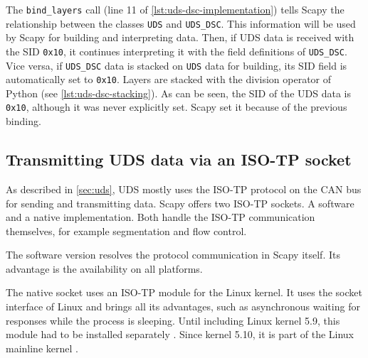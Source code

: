 The \texttt{bind_layers} call (line 11 of \autoref{lst:uds-dsc-implementation}) tells Scapy the relationship between the classes \texttt{UDS} and \texttt{UDS_DSC}. This information will be used by Scapy for building and interpreting data.
Then, if UDS data is received with the SID \texttt{0x10}, it continues interpreting it with the field definitions of \texttt{UDS_DSC}. Vice versa, if \texttt{UDS_DSC} data is stacked on \texttt{UDS} data for building, its SID field is automatically set to \texttt{0x10}. Layers are stacked with the division operator of Python (see \autoref{lst:uds-dsc-stacking}). As can be seen, the SID of the UDS data is \texttt{0x10}, although it was never explicitly set. Scapy set it because of the previous binding.




\subsection{Transmitting UDS data via an ISO-TP socket}
\label{subsec:isotp}

As described in \autoref{sec:uds}, UDS mostly uses the ISO-TP protocol on the CAN bus for sending and transmitting data.
Scapy offers two ISO-TP sockets. A software and a native implementation. Both handle the ISO-TP communication themselves, for example segmentation and flow control.

The software version resolves the protocol communication in Scapy itself. Its advantage is the availability on all platforms.

The native socket uses an ISO-TP module for the Linux kernel. It uses the socket interface of Linux and brings all its advantages, such as asynchronous waiting for responses while the process is sleeping. Until including Linux kernel 5.9, this module had to be installed separately \cite{isotp-module}. Since kernel 5.10, it is part of the Linux mainline kernel \cite{isotp-commit}.

